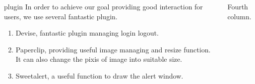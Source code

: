 \documentclass[final]{beamer}
\newlength{\sepwid}
\newlength{\onecolwid}
\newlength{\twocolwid}
\begin{document}
\begin{frame}[t]
\begin{columns}[t]
\begin{column}{\onecolwid}
        \begin{block}{plugin}
            In order to achieve our goal providing good interaction for users, we use several fantastic plugin.
            \begin{enumerate}
            \item Devise, fantastic plugin managing login logout.
            \item Paperclip, providing useful image managing and resize function. It can also change the pixis of image into suitable size.
            \item Sweetalert, a useful function to draw the alert window.
            \end{enumerate}
        \end{block}



    \end{column} %
        
    \begin{column}{\onecolwid}
        Fourth column.
    \end{column}
\end{columns} %









\end{frame}
\end{document}
